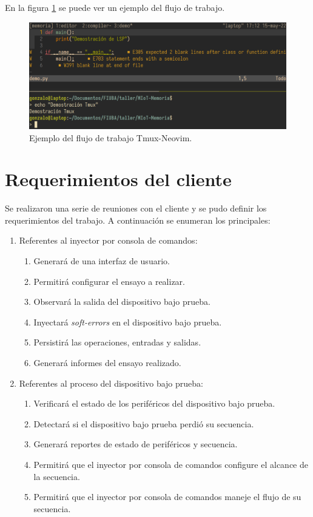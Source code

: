 En la figura \ref{fig:nvim} se puede ver un ejemplo del flujo de trabajo.

\begin{figure}[htbp]
	\centering
	\includegraphics[width=\textwidth]{./Figures/nvimtmux.png}
    \caption{Ejemplo del flujo de trabajo Tmux-Neovim.}
	\label{fig:nvim}
\end{figure}

\newpage

\section{Requerimientos del cliente}
\label{sec:emphuerimientos}

Se realizaron una serie de reuniones con el cliente y se pudo definir los requerimientos del trabajo.
A continuación se enumeran los principales:

\begin{enumerate}
	\item Referentes al inyector por consola de comandos:
		\begin{enumerate}
			\item Generará de una interfaz de usuario.
			\item Permitirá configurar el ensayo a realizar.
			\item Observará la salida del dispositivo bajo prueba.
            \item Inyectará \emph{soft-errors} en el dispositivo bajo prueba.
			\item Persistirá las operaciones, entradas y salidas.
			\item Generará informes del ensayo realizado.
		\end{enumerate}
	\item Referentes al proceso del dispositivo bajo prueba:
		\begin{enumerate}
			\item Verificará el estado de los periféricos del dispositivo bajo prueba.
			\item Detectará si el dispositivo bajo prueba perdió su secuencia.
			\item Generará reportes de estado de periféricos y secuencia.
			\item Permitirá que el inyector por consola de comandos configure el alcance de la secuencia.
			\item Permitirá que el inyector por consola de comandos maneje el flujo de su secuencia.
		\end{enumerate}
\end{enumerate}

